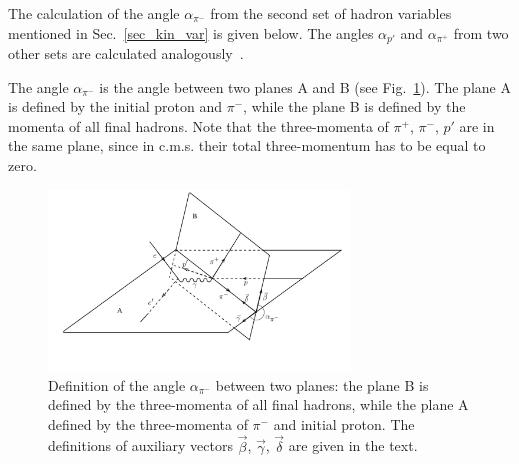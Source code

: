 \documentclass[prc,twocolumn,superscriptaddress,showpacs,amssymb,amsmath,amsfonts,linenumbers,aps]{revtex4-1}
\begin{document}
The calculation of the angle $\alpha_{\pi^{-}}$ from the second set of hadron variables mentioned in Sec.~\ref{sec_kin_var} is given below. The angles $\alpha_{p'}$ and $\alpha_{\pi^{+}}$ from two other sets are calculated analogously~\cite{Fed_an_note:2017}.

The angle $\alpha_{\pi^{-}}$ is the angle between two planes A and B (see Fig.~\ref{fig:cr_sec_kinematic2}).
The plane A is defined by
the initial proton and $\pi^{-}$, while the plane B is defined by the momenta of
all final hadrons. Note that the three-momenta of $\pi^{+}$,
$\pi^{-}$, $p'$ are in the same plane, since in c.m.s.
their total three-momentum has to be equal to zero.


\begin{figure}[htp]
\begin{center}
\includegraphics[width=8cm]{pictures/angles/alpha1.pdf}
\caption{\small Definition of the angle $\alpha_{\pi^{-}}$ between two planes: the plane B is defined by the three-momenta of all final hadrons, while the plane A defined by  the three-momenta of $\pi^{-}$ and initial proton. The definitions of  auxiliary vectors $\vec \beta$, $\vec \gamma$, $\vec \delta$ are given in the text.} \label{fig:cr_sec_kinematic2}
\end{center}
\end{figure}
\end{document}
